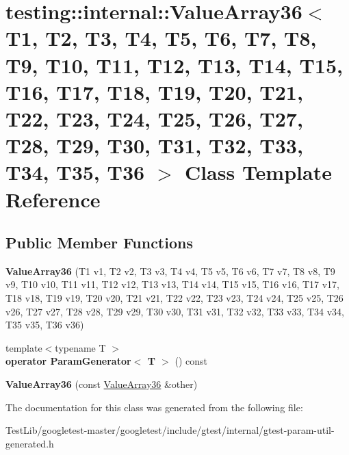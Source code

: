 \hypertarget{classtesting_1_1internal_1_1ValueArray36}{}\section{testing\+:\+:internal\+:\+:Value\+Array36$<$ T1, T2, T3, T4, T5, T6, T7, T8, T9, T10, T11, T12, T13, T14, T15, T16, T17, T18, T19, T20, T21, T22, T23, T24, T25, T26, T27, T28, T29, T30, T31, T32, T33, T34, T35, T36 $>$ Class Template Reference}
\label{classtesting_1_1internal_1_1ValueArray36}
\subsection*{Public Member Functions}
\begin{DoxyCompactItemize}
\item 
\mbox{\label{classtesting_1_1internal_1_1ValueArray36_ab8c5d6f3e523dd0926b664ae0c34e30b}} 
{\bfseries Value\+Array36} (T1 v1, T2 v2, T3 v3, T4 v4, T5 v5, T6 v6, T7 v7, T8 v8, T9 v9, T10 v10, T11 v11, T12 v12, T13 v13, T14 v14, T15 v15, T16 v16, T17 v17, T18 v18, T19 v19, T20 v20, T21 v21, T22 v22, T23 v23, T24 v24, T25 v25, T26 v26, T27 v27, T28 v28, T29 v29, T30 v30, T31 v31, T32 v32, T33 v33, T34 v34, T35 v35, T36 v36)
\item 
\mbox{\label{classtesting_1_1internal_1_1ValueArray36_ae47fff761f51a81079671c58fd2c2ae2}} 
{\footnotesize template$<$typename T $>$ }\\{\bfseries operator Param\+Generator$<$ T $>$} () const
\item 
\mbox{\label{classtesting_1_1internal_1_1ValueArray36_a52cc12e4285b0331969b98a116ebcad0}} 
{\bfseries Value\+Array36} (const \hyperlink{classtesting_1_1internal_1_1ValueArray36}{Value\+Array36} \&other)
\end{DoxyCompactItemize}


The documentation for this class was generated from the following file\+:\begin{DoxyCompactItemize}
\item 
Test\+Lib/googletest-\/master/googletest/include/gtest/internal/gtest-\/param-\/util-\/generated.\+h\end{DoxyCompactItemize}
